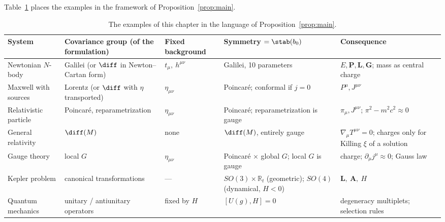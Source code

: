 Table~\ref{tab:summary} places the examples in the framework of
Proposition~\ref{prop:main}.

\begin{table}[ht]
\centering
\footnotesize
\renewcommand{\arraystretch}{1.25}
\setlength{\tabcolsep}{3pt}
\begin{tabular}{@{}>{\raggedright\arraybackslash}p{2.2cm}>{\raggedright\arraybackslash}p{3.1cm}>{\raggedright\arraybackslash}p{2.7cm}>{\raggedright\arraybackslash}p{3.5cm}>{\raggedright\arraybackslash}p{3.1cm}@{}}
\toprule
System & Covariance group (of the formulation)
  & Fixed background & Symmetry $=\stab(b_0)$ & Consequence\\
\midrule
Newtonian $N$-body & Galilei (or $\diff$ in Newton--Cartan form)
  & $t_\mu,\ h^{\mu\nu}$ & Galilei, 10 parameters
  & $E,\bm P,\bm L,\bm G$; mass as central charge\\
Maxwell with sources & Lorentz (or $\diff$ with $\eta$ transported)
  & $\eta_{\mu\nu}$ & Poincar\'e; conformal if $j=0$
  & $P^\mu,J^{\mu\nu}$\\
Relativistic particle & Poincar\'e, reparametrization
  & $\eta_{\mu\nu}$ & Poincar\'e; reparametrization is gauge
  & $\pi_\mu,J^{\mu\nu}$; $\pi^2-m^2c^2\approx0$\\
General relativity & $\diff(M)$ & none & $\diff(M)$, entirely gauge
  & $\nabla_\mu T^{\mu\nu}=0$; charges only for Killing $\xi$ of a solution\\
Gauge theory & local $G$ & $\eta_{\mu\nu}$
  & Poincar\'e $\times$ global $G$; local $G$ is gauge
  & charge; $\partial_\mu j^\mu\approx0$; Gauss law\\
Kepler problem & canonical transformations & --- 
  & $SO(3)\times\mathbb R_t$ (geometric); $SO(4)$ (dynamical, $H<0$)
  & ${\bm{L}},\ \bm A,\ H$\\
Quantum mechanics & unitary / antiunitary operators & fixed by $H$
  & $[U(g),H]=0$
  & degeneracy multiplets; selection rules\\
\bottomrule
\end{tabular}
\caption{The examples of this chapter in the language of
Proposition~\ref{prop:main}.}
\label{tab:summary}
\end{table}

